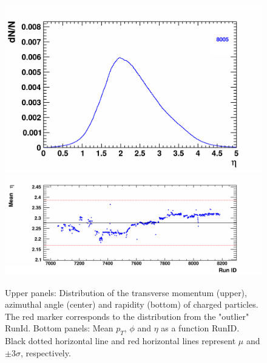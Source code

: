 \begin{figure}[H]
\begin{center}
            \includegraphics[width=0.35\linewidth]{../pict/QA_RunByRun_24.12/H1/nVtxTr_h2_RunId_tr_eta.png}
            \includegraphics[width=0.60\linewidth]{../pict/QA_RunByRun_24.12/nVtxTr_h2_RunId_tr_eta.png}
            \vspace{-3mm}
            \caption{Upper panels: Distribution of the transverse momentum (upper), azimuthal angle (center) and rapidity (bottom) of charged particles. The red marker corresponds to the distribution from the "outlier" RunId. Bottom panels: Mean $p_T$, $\phi$ and $\eta$ as a function RunID. Black dotted horizontal line and red horizontal lines represent $\mu$ and $\pm3\sigma$, respectively.}
        \end{center}
        \label{track_par}
        \vspace{-5mm}
    \end{figure}

